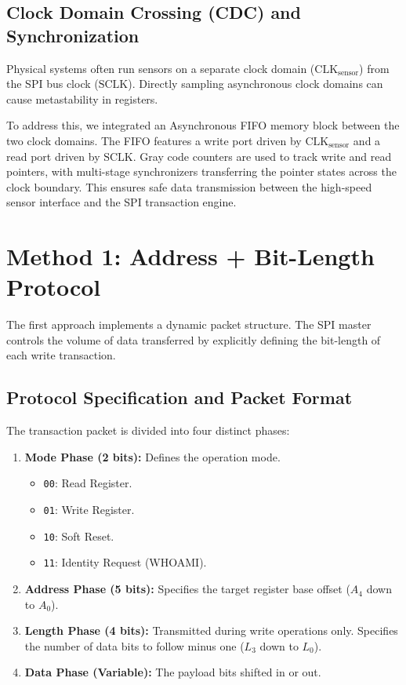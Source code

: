 \documentclass[conference]{IEEEtran}
\begin{document}
\subsection{Clock Domain Crossing (CDC) and Synchronization}
Physical systems often run sensors on a separate clock domain ($\text{CLK}_{\text{sensor}}$) from the SPI bus clock ($\text{SCLK}$). Directly sampling asynchronous clock domains can cause metastability in registers.

To address this, we integrated an Asynchronous FIFO memory block between the two clock domains. The FIFO features a write port driven by $\text{CLK}_{\text{sensor}}$ and a read port driven by $\text{SCLK}$. Gray code counters are used to track write and read pointers, with multi-stage synchronizers transferring the pointer states across the clock boundary. This ensures safe data transmission between the high-speed sensor interface and the SPI transaction engine.

\section{Method 1: Address + Bit-Length Protocol}
The first approach implements a dynamic packet structure. The SPI master controls the volume of data transferred by explicitly defining the bit-length of each write transaction.

\subsection{Protocol Specification and Packet Format}
The transaction packet is divided into four distinct phases:
\begin{enumerate}
    \item \textbf{Mode Phase (2 bits):} Defines the operation mode.
        \begin{itemize}
            \item \texttt{00}: Read Register.
            \item \texttt{01}: Write Register.
            \item \texttt{10}: Soft Reset.
            \item \texttt{11}: Identity Request (WHOAMI).
        \end{itemize}
    \item \textbf{Address Phase (5 bits):} Specifies the target register base offset ($A_4$ down to $A_0$).
    \item \textbf{Length Phase (4 bits):} Transmitted during write operations only. Specifies the number of data bits to follow minus one ($L_3$ down to $L_0$).
    \item \textbf{Data Phase (Variable):} The payload bits shifted in or out.
\end{enumerate}
\end{document}
